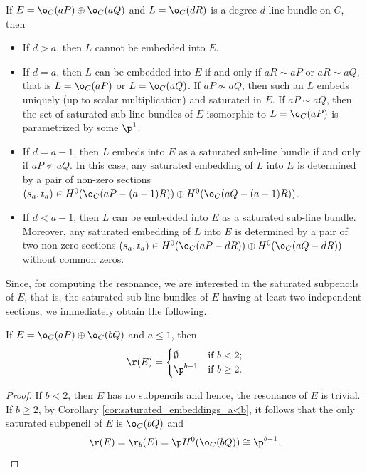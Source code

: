 \documentclass[10pt, leqno]{amsart}
\begin{document}
\begin{cor} \label{cor_saturated_embeddings_a=b}
If $E = \o_C(aP) \oplus \o_C(aQ)$ and $L = \o_C(dR)$ is a degree $d$ line bundle on $C$, then
\begin{itemize}
    \item [(a)] If $d > a$, then $L$ cannot be embedded into $E$.
    \item [(b)] If $d = a$, then $L$ can be embedded into $E$ if and only if $aR \sim aP$ or $aR \sim aQ$, that is $L = \o_C(aP)$ or $L = \o_C(aQ)$. If $aP \not\sim aQ$, then such an $L$ embeds uniquely (up to scalar multiplication) and saturated in $E$. If $aP \sim aQ$, then the set of saturated sub-line bundles of $E$ isomorphic to $L = \o_C(aP)$ is parametrized by some $\p^1$.
    \item [(c)] If $d = a - 1$, then $L$ embeds into $E$ as a saturated sub-line bundle if and only if $aP \not\sim aQ$. In this case, any saturated embedding of $L$ into $E$ is determined by a pair of non-zero sections $(s_a, t_a) \in H^0(\o_C(aP - (a-1)R)) \oplus H^0(\o_C(aQ - (a-1)R))$.
    \item[(d)] If $d < a -1$, then $L$ can be embedded into $E$ as a saturated sub-line bundle. Moreover, any saturated embedding of $L$ into $E$ is determined by a pair of two non-zero sections $(s_a, t_a) \in H^0(\o_C(aP - dR)) \oplus H^0(\o_C(aQ - dR))$ without common zeros. 
\end{itemize}
\end{cor}

Since, for computing the resonance, we are interested in the saturated subpencils of $E$, that is, the saturated sub-line bundles of $E$ having at least two independent sections, we immediately obtain the following.

\begin{prop} \label{prop:particular_cases}
If $E = \o_C(aP) \oplus \o_C(bQ)$ and $a \le 1$, then
\[
\r(E) = \begin{cases}
      \emptyset & \text{if}\ b < 2; \\
      \p^{b-1}  & \text{if}\ b \ge 2.
    \end{cases}  
\]
\end{prop}

\begin{proof}
If $b < 2$, then $E$ has no subpencils and hence, the resonance of $E$ is trivial. If $b \ge 2$, by Corollary \ref{cor:saturated_embeddings_a<b}, it follows that the only saturated subpencil of $E$ is $\o_C(bQ)$ and 
\[
\r(E) = \r_b(E) = \p H^0 (\o_C(bQ)) \cong \p^{b-1}.
\]
\end{proof}
\end{document}
